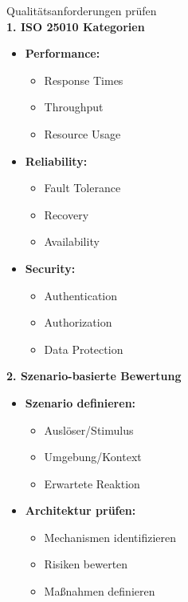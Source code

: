 \begin{KR}{Qualitätsanforderungen prüfen}\\
\textbf{1. ISO 25010 Kategorien}
\begin{itemize}
    \item \textbf{Performance:}
    \begin{itemize}
        \item Response Times
        \item Throughput
        \item Resource Usage
    \end{itemize}
    
    \item \textbf{Reliability:}
    \begin{itemize}
        \item Fault Tolerance
        \item Recovery
        \item Availability
    \end{itemize}
    
    \item \textbf{Security:}
    \begin{itemize}
        \item Authentication
        \item Authorization
        \item Data Protection
    \end{itemize}
\end{itemize}

\textbf{2. Szenario-basierte Bewertung}
\begin{itemize}
    \item \textbf{Szenario definieren:}
    \begin{itemize}
        \item Auslöser/Stimulus
        \item Umgebung/Kontext
        \item Erwartete Reaktion
    \end{itemize}
    
    \item \textbf{Architektur prüfen:}
    \begin{itemize}
        \item Mechanismen identifizieren
        \item Risiken bewerten
        \item Maßnahmen definieren
    \end{itemize}
\end{itemize}
\end{KR}

